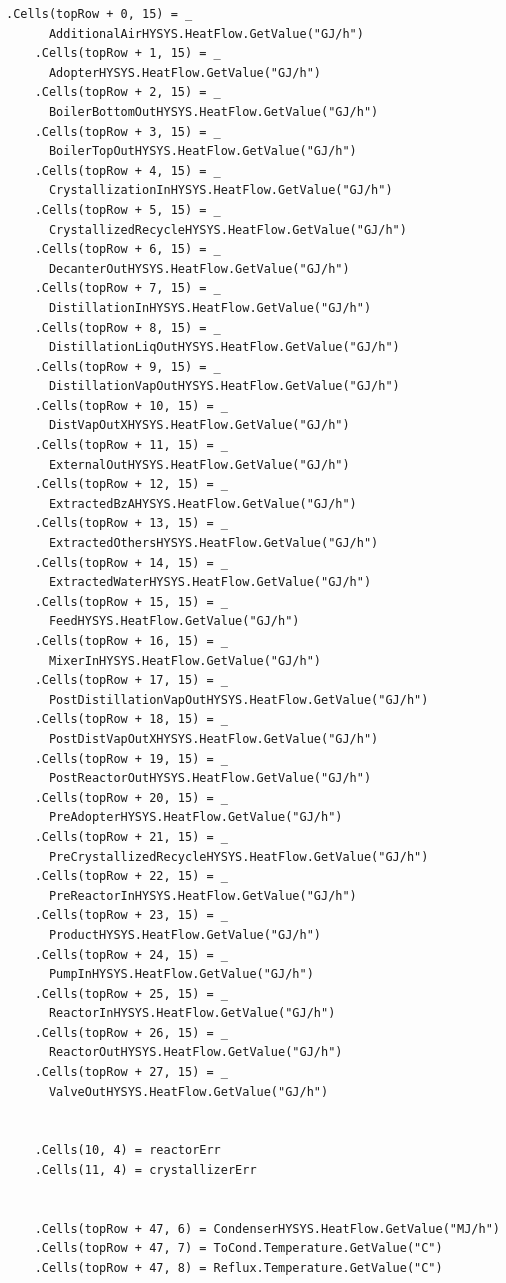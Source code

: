 \documentclass[a4j]{jsreport}
\begin{document}
\begin{lstlisting}[caption=HYSYSとpythonを繋ぐコード]
    .Cells(topRow + 0, 15) = _
      AdditionalAirHYSYS.HeatFlow.GetValue("GJ/h")
    .Cells(topRow + 1, 15) = _
      AdopterHYSYS.HeatFlow.GetValue("GJ/h")
    .Cells(topRow + 2, 15) = _
      BoilerBottomOutHYSYS.HeatFlow.GetValue("GJ/h")
    .Cells(topRow + 3, 15) = _
      BoilerTopOutHYSYS.HeatFlow.GetValue("GJ/h")
    .Cells(topRow + 4, 15) = _
      CrystallizationInHYSYS.HeatFlow.GetValue("GJ/h")
    .Cells(topRow + 5, 15) = _
      CrystallizedRecycleHYSYS.HeatFlow.GetValue("GJ/h")
    .Cells(topRow + 6, 15) = _
      DecanterOutHYSYS.HeatFlow.GetValue("GJ/h")
    .Cells(topRow + 7, 15) = _
      DistillationInHYSYS.HeatFlow.GetValue("GJ/h")
    .Cells(topRow + 8, 15) = _
      DistillationLiqOutHYSYS.HeatFlow.GetValue("GJ/h")
    .Cells(topRow + 9, 15) = _
      DistillationVapOutHYSYS.HeatFlow.GetValue("GJ/h")
    .Cells(topRow + 10, 15) = _
      DistVapOutXHYSYS.HeatFlow.GetValue("GJ/h")
    .Cells(topRow + 11, 15) = _
      ExternalOutHYSYS.HeatFlow.GetValue("GJ/h")
    .Cells(topRow + 12, 15) = _
      ExtractedBzAHYSYS.HeatFlow.GetValue("GJ/h")
    .Cells(topRow + 13, 15) = _
      ExtractedOthersHYSYS.HeatFlow.GetValue("GJ/h")
    .Cells(topRow + 14, 15) = _
      ExtractedWaterHYSYS.HeatFlow.GetValue("GJ/h")
    .Cells(topRow + 15, 15) = _
      FeedHYSYS.HeatFlow.GetValue("GJ/h")
    .Cells(topRow + 16, 15) = _
      MixerInHYSYS.HeatFlow.GetValue("GJ/h")
    .Cells(topRow + 17, 15) = _
      PostDistillationVapOutHYSYS.HeatFlow.GetValue("GJ/h")
    .Cells(topRow + 18, 15) = _
      PostDistVapOutXHYSYS.HeatFlow.GetValue("GJ/h")
    .Cells(topRow + 19, 15) = _
      PostReactorOutHYSYS.HeatFlow.GetValue("GJ/h")
    .Cells(topRow + 20, 15) = _
      PreAdopterHYSYS.HeatFlow.GetValue("GJ/h")
    .Cells(topRow + 21, 15) = _
      PreCrystallizedRecycleHYSYS.HeatFlow.GetValue("GJ/h")
    .Cells(topRow + 22, 15) = _
      PreReactorInHYSYS.HeatFlow.GetValue("GJ/h")
    .Cells(topRow + 23, 15) = _
      ProductHYSYS.HeatFlow.GetValue("GJ/h")
    .Cells(topRow + 24, 15) = _
      PumpInHYSYS.HeatFlow.GetValue("GJ/h")
    .Cells(topRow + 25, 15) = _
      ReactorInHYSYS.HeatFlow.GetValue("GJ/h")
    .Cells(topRow + 26, 15) = _
      ReactorOutHYSYS.HeatFlow.GetValue("GJ/h")
    .Cells(topRow + 27, 15) = _
      ValveOutHYSYS.HeatFlow.GetValue("GJ/h")


    .Cells(10, 4) = reactorErr
    .Cells(11, 4) = crystallizerErr


    .Cells(topRow + 47, 6) = CondenserHYSYS.HeatFlow.GetValue("MJ/h")
    .Cells(topRow + 47, 7) = ToCond.Temperature.GetValue("C")
    .Cells(topRow + 47, 8) = Reflux.Temperature.GetValue("C")


\end{lstlisting}
\end{document}
